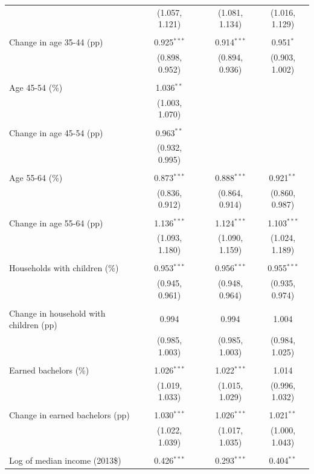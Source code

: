 \documentclass[]{article}
\begin{document}
\begin{landscape}
\begin{longtable}[c]{@{}lccccc@{}}
  &  & (1.057, 1.121) &  & (1.081, 1.134) & (1.016, 1.129) \\ 
  & & & & & \\ 
 Change in age 35-44 (pp) &  & 0.925$^{***}$ &  & 0.914$^{***}$ & 0.951$^{*}$ \\ 
  &  & (0.898, 0.952) &  & (0.894, 0.936) & (0.903, 1.002) \\ 
  & & & & & \\ 
 Age 45-54 (\%) &  & 1.036$^{**}$ &  &  &  \\ 
  &  & (1.003, 1.070) &  &  &  \\ 
  & & & & & \\ 
 Change in age 45-54 (pp) &  & 0.963$^{**}$ &  &  &  \\ 
  &  & (0.932, 0.995) &  &  &  \\ 
  & & & & & \\ 
 Age 55-64 (\%) &  & 0.873$^{***}$ &  & 0.888$^{***}$ & 0.921$^{**}$ \\ 
  &  & (0.836, 0.912) &  & (0.864, 0.914) & (0.860, 0.987) \\ 
  & & & & & \\ 
 Change in age 55-64 (pp) &  & 1.136$^{***}$ &  & 1.124$^{***}$ & 1.103$^{***}$ \\ 
  &  & (1.093, 1.180) &  & (1.090, 1.159) & (1.024, 1.189) \\ 
  & & & & & \\ 
 Households with children (\%) &  & 0.953$^{***}$ &  & 0.956$^{***}$ & 0.955$^{***}$ \\ 
  &  & (0.945, 0.961) &  & (0.948, 0.964) & (0.935, 0.974) \\ 
  & & & & & \\ 
 Change in household with children (pp) &  & 0.994 &  & 0.994 & 1.004 \\ 
  &  & (0.985, 1.003) &  & (0.985, 1.003) & (0.984, 1.025) \\ 
  & & & & & \\ 
 Earned bachelors (\%) &  & 1.026$^{***}$ &  & 1.022$^{***}$ & 1.014 \\ 
  &  & (1.019, 1.033) &  & (1.015, 1.029) & (0.996, 1.032) \\ 
  & & & & & \\ 
 Change in earned bachelors (pp) &  & 1.030$^{***}$ &  & 1.026$^{***}$ & 1.021$^{**}$ \\ 
  &  & (1.022, 1.039) &  & (1.017, 1.035) & (1.000, 1.043) \\ 
  & & & & & \\ 
 Log of median income (2013\$) &  & 0.426$^{***}$ &  & 0.293$^{***}$ & 0.404$^{**}$ \\ 

\end{longtable}
\end{landscape}
\end{document}
